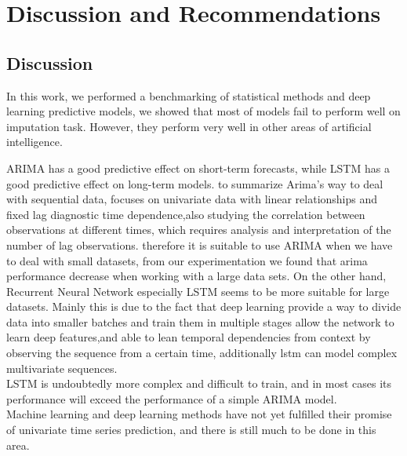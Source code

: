 
\chapter{Discussion and Recommendations} \label{hgr}

\section{Discussion  }

In this work, we performed a benchmarking of statistical methods and deep learning predictive  models, we showed that most of models fail to perform well on imputation task. However, they perform very well in other areas of artificial intelligence.

ARIMA has a good predictive effect on short-term forecasts, while LSTM has a good predictive effect on long-term models. to summarize Arima's way to deal with sequential data, focuses on univariate data with linear relationships and fixed lag  diagnostic time dependence,also studying the correlation between observations at different times, which requires analysis and interpretation of the number of lag observations. therefore it is suitable to use ARIMA  when we have to deal with small datasets, from our experimentation we found that arima performance decrease when working with a large data sets. On the other hand, Recurrent Neural Network especially LSTM seems to be more suitable for large datasets. Mainly this is due to  the fact that deep learning  provide a way to divide data  into smaller batches and train them in multiple stages allow the network to learn deep features,and able to lean temporal dependencies from context by observing the sequence from a certain time, additionally lstm  can model complex multivariate sequences.\\LSTM is undoubtedly more complex and difficult to train, and in most cases its performance will  exceed the performance of a simple ARIMA model.\\Machine learning and deep learning methods have not yet fulfilled their promise of univariate time series prediction, and there is still much to be done in this area.


